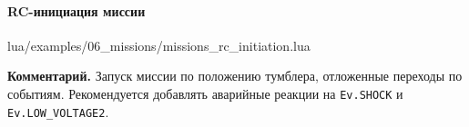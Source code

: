 \paragraph{RC-инициация миссии}
\begin{codefile}{lua/examples/06_missions/missions_rc_initiation.lua}
\end{codefile}
\textbf{Комментарий.} Запуск миссии по положению тумблера, отложенные переходы по событиям. Рекомендуется добавлять аварийные реакции на \texttt{Ev.SHOCK} и \texttt{Ev.LOW\_VOLTAGE2}.
